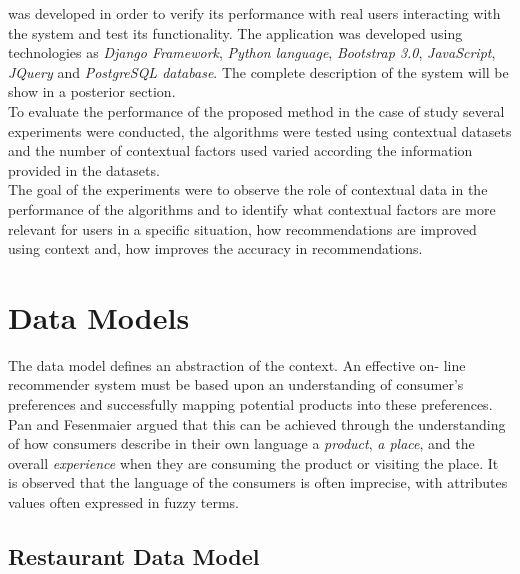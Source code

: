was developed 
in order to verify its performance with real users interacting with 
the system and
test  its functionality.  The application was developed using
technologies as \textit{Django Framework}, \textit{Python language}, 
\textit{Bootstrap 3.0},
\textit{JavaScript}, \textit{JQuery} and  \textit{PostgreSQL database}. 
The complete description of the system will be show in a posterior section.\\ 
To evaluate the performance of the proposed method in
the case of study several experiments were conducted, the algorithms
were tested using  contextual datasets and the number of contextual
factors used varied  according the information provided in the
datasets. \\ The goal of the  experiments were to observe the role of
contextual data  in the performance of the algorithms and to
identify what contextual factors are more relevant for users in a
specific situation, how recommendations are improved using context
and, how improves the accuracy in recommendations.

\section{Data Models}

The data model defines an abstraction of the context. An effective on-
line  recommender system must be based upon an understanding of
consumer's  preferences and successfully mapping potential products
into these preferences\cite{adomavicius2011context}. Pan and
Fesenmaier\cite{pan2006online} argued that this can be achieved
through the understanding of  how consumers describe in their own
language a \textit{product}, \textit{a place}, and the overall
\textit{experience}  when they are consuming the product or visiting
the place.  It is observed that  the language of the consumers is
often imprecise,  with attributes values often expressed in fuzzy
terms.

\subsection{Restaurant Data Model}

